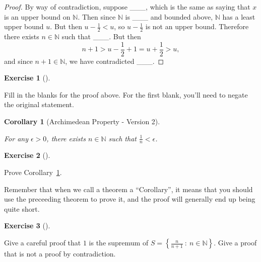 \documentclass[
  letterpaper,
  DIV=11,
  numbers=noendperiod]{scrreprt}
\def\N{\mathbb N}
\newcommand{\st}{~:~}
\theoremstyle{plain}
\theoremstyle{definition}
\newtheorem{exercise}{Exercise}[chapter]
\theoremstyle{plain}
\newtheorem{corollary}{Corollary}[chapter]
\theoremstyle{plain}
\theoremstyle{definition}
\theoremstyle{definition}
\theoremstyle{remark}
\begin{document}
\begin{proof}
By way of contradiction, suppose \_\_\_, which is the same as saying
that \(x\) is an upper bound on \(\N\). Then since \(\N\) is \_\_\_ and
bounded above, \(\N\) has a least upper bound \(u.\) But then
\(u-\frac{1}{2}<u\), so \(u-\frac{1}{2}\) is not an upper bound.
Therefore there exists \(n\in\N\) such that \_\_\_. But then
\[n+1>u-\frac{1}{2}+1=u+\frac{1}{2}>u,\] and since \(n+1\in\N\), we have
contradicted \_\_\_.
\end{proof}

\begin{exercise}[]\protect\hypertarget{exr-arch-fill-in-blanks}{}\label{exr-arch-fill-in-blanks}

Fill in the blanks for the proof above. For the first blank, you'll need
to negate the original statement.

\end{exercise}

\begin{corollary}[Archimedean Property - Version
2]\protect\hypertarget{cor-arch-prop}{}\label{cor-arch-prop}

For any \(\epsilon>0\), there exists \(n\in\N\) such that
\(\frac{1}{n}<\epsilon\).

\end{corollary}

\begin{exercise}[]\protect\hypertarget{exr-prove-arch-prop}{}\label{exr-prove-arch-prop}

Prove Corollary~\ref{cor-arch-prop}.

\end{exercise}

\begin{tcolorbox}[enhanced jigsaw, titlerule=0mm, opacitybacktitle=0.6, leftrule=.75mm, bottomrule=.15mm, left=2mm, arc=.35mm, colback=white, rightrule=.15mm, colframe=quarto-callout-tip-color-frame, toptitle=1mm, breakable, opacityback=0, colbacktitle=quarto-callout-tip-color!10!white, bottomtitle=1mm, title=\textcolor{quarto-callout-tip-color}{\faLightbulb}\hspace{0.5em}{Hint}, coltitle=black, toprule=.15mm]

Remember that when we call a theorem a ``Corollary'', it means that you
should use the preceeding theorem to prove it, and the proof will
generally end up being quite short.

\end{tcolorbox}

\begin{exercise}[]\protect\hypertarget{exr-careful-sup-proof}{}\label{exr-careful-sup-proof}

Give a careful proof that \(1\) is the supremum of
\(S=\left\{\frac{n}{n+1}\st n\in\N\right\}\). Give a proof that is not a
proof by contradiction.

\end{exercise}
\end{document}
